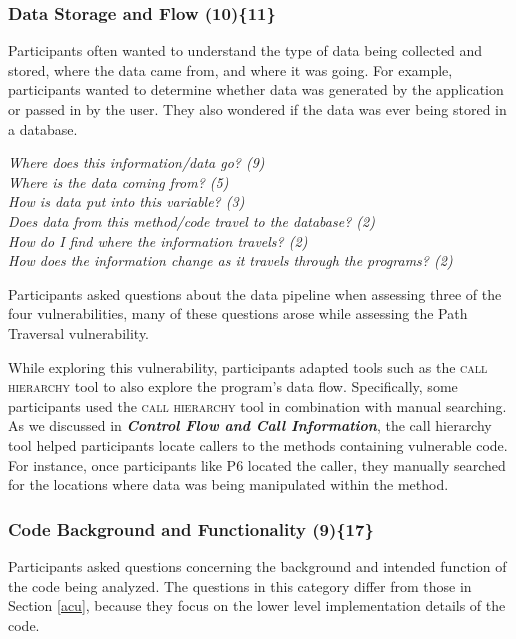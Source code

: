 \documentclass{acm_proc_article-sp}
\begin{document}
\subsubsection{\textbf{Data Storage and Flow (10)\{11\}}}\label{dsf}
Participants often wanted to understand the type of data being collected and stored, where the data came from, and where it was going. 
For example, participants wanted to determine whether data was generated by the application or passed in by the user. They also wondered if the data was ever being stored in a database.

\noindent\emph{Where does this information/data go? (9)} \\
\emph{Where is the data coming from? (5)} \\
\emph{How is data put into this variable? (3)} \\
\emph{Does data from this method/code travel to the database? (2)} \\
\emph{How do I find where the information travels? (2)} \\
\emph{How does the information change as it travels through the programs? (2)} 


 
Participants asked questions about the data pipeline when assessing three of the four vulnerabilities, many of these questions arose while assessing the Path Traversal vulnerability. 

While exploring this vulnerability, participants adapted tools such as the \textsc{call hierarchy} tool to also explore the program's data flow. 
Specifically, some participants used the \textsc{call hierarchy} tool in combination with manual searching. 
As we discussed in \emph{\textbf{Control Flow and Call Information}}, the call hierarchy tool helped participants locate callers to the methods containing vulnerable code.
For instance, once participants like P6 located the caller, they manually searched for the locations where data was being manipulated within the method.



\subsubsection{\textbf{Code Background and Functionality (9)\{17\}}}
\label{cbf}
Participants asked questions concerning the background and intended function of the code being analyzed. 
The questions in this category differ from those in Section \ref{acu}, because they focus on the lower level implementation details of the code.
\end{document}
